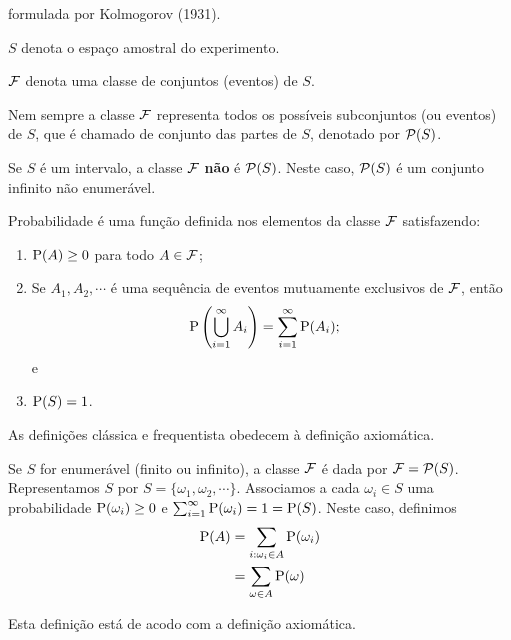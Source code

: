 \begin{definition}
    formulada por Kolmogorov (1931).

    $S$ denota o espaço amostral do experimento.
    
    $\operatorname{\mathcal{F}}$ denota uma classe de conjuntos (eventos) de $S$.

    \begin{obs}
        Nem sempre a classe $\operatorname{\mathcal{F}}$ representa todos os possíveis subconjuntos
        (ou eventos) de $S$, que é chamado de conjunto das partes de $S$,
        denotado por $\operatorname{\mathcal{P}}(S)$.

        Se $S$ é um intervalo, a classe $\operatorname{\mathcal{F}}$ \textbf{não} é $\operatorname{\mathcal{P}}(S)$.
        Neste caso, $\operatorname{\mathcal{P}}(S)$ é um conjunto infinito não enumerável.
    \end{obs}
\end{definition}

\begin{definition}\label{def:axiomatica}
    Probabilidade é uma função definida nos elementos da classe $\operatorname{\mathcal{F}}$
    satisfazendo:
    \begin{enumerate}
        \item \label{it:ch01-axioma-1} $\operatorname{P}(A) \geq 0$ para todo $A \in \operatorname{\mathcal{F}}$;
        \item \label{it:ch01-axioma-2} Se $A_1, A_2, \cdots$ é uma sequência de eventos
        mutuamente exclusivos de $\operatorname{\mathcal{F}}$, então \begin{align*}
            \operatorname{P}\left(\bigcup_{i=1}^\infty A_i\right)
                &= \sum_{i=1}^\infty \operatorname{P}(A_i);
        \end{align*} e
        \item \label{it:ch01-axioma-3}$\operatorname{P}(S) = 1$.
    \end{enumerate}
\end{definition}

\begin{obs}
    As definições clássica e frequentista obedecem à definição axiomática.
\end{obs}

Se $S$ for enumerável (finito ou infinito), a classe $\operatorname{\mathcal{F}}$ é dada por
$\operatorname{\mathcal{F}} = \operatorname{\mathcal{P}}(S)$. Representamos $S$ por $S = \{\omega_1, \omega_2, \cdots\}$.
Associamos a cada $\omega_i \in S$ uma probabilidade $\operatorname{P}(\omega_i) \geq 0$
e $\sum_{i = 1}^\infty \operatorname{P}(\omega_i) = 1 = \operatorname{P}(S)$. Neste caso, definimos
\begin{align*}
    \operatorname{P}(A) &= \sum_{i: \omega_i \in A} \operatorname{P}(\omega_i) \\
    &= \sum_{\omega \in A} \operatorname{P}(\omega)
\end{align*}

Esta definição está de acodo com a definição axiomática.